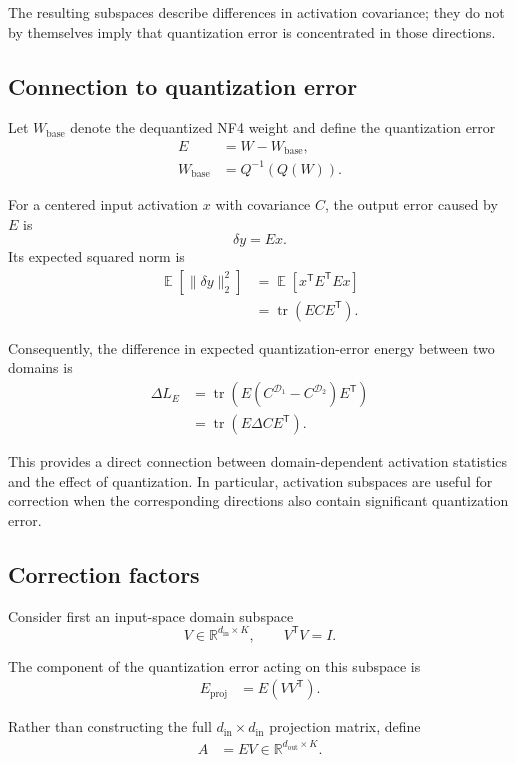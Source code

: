 \documentclass[11pt,a4paper]{article}
\DeclareMathOperator{\E}{\mathbb{E}}
\DeclareMathOperator{\tr}{tr}
\begin{document}
The resulting subspaces describe differences in activation covariance;
they do not by themselves imply that quantization error is concentrated
in those directions.

\subsection{Connection to quantization error}

Let $W_{\mathrm{base}}$ denote the dequantized NF4 weight and define
the quantization error
\begin{align}
E
&=
W-W_{\mathrm{base}},
\\
W_{\mathrm{base}}
&=
Q^{-1}(Q(W)).
\end{align}

For a centered input activation $x$ with covariance $C$, the output
error caused by $E$ is
\[
\delta y = Ex.
\]
Its expected squared norm is
\begin{align}
\E\left[\|\delta y\|_2^2\right]
&=
\E\left[x^{\mathsf T}E^{\mathsf T}Ex\right]
\\
&=
\tr\left(ECE^{\mathsf T}\right).
\end{align}

Consequently, the difference in expected quantization-error energy
between two domains is
\begin{align}
\Delta L_E
&=
\tr\left(
E
(C^{\mathcal{D}_1}-C^{\mathcal{D}_2})
E^{\mathsf T}
\right)
\\
&=
\tr\left(E\Delta C E^{\mathsf T}\right).
\end{align}

This provides a direct connection between domain-dependent activation
statistics and the effect of quantization. In particular, activation
subspaces are useful for correction when the corresponding directions
also contain significant quantization error.

\subsection{Correction factors}

Consider first an input-space domain subspace
\[
V\in\mathbb{R}^{d_{\mathrm{in}}\times K},
\qquad
V^{\mathsf T}V=I.
\]

The component of the quantization error acting on this subspace is
\begin{align}
E_{\mathrm{proj}}
&=
E(VV^{\mathsf T}).
\end{align}

Rather than constructing the full
$d_{\mathrm{in}}\times d_{\mathrm{in}}$ projection matrix, define
\begin{align}
A
&=
EV
\in
\mathbb{R}^{d_{\mathrm{out}}\times K}.
\end{align}
\end{document}
